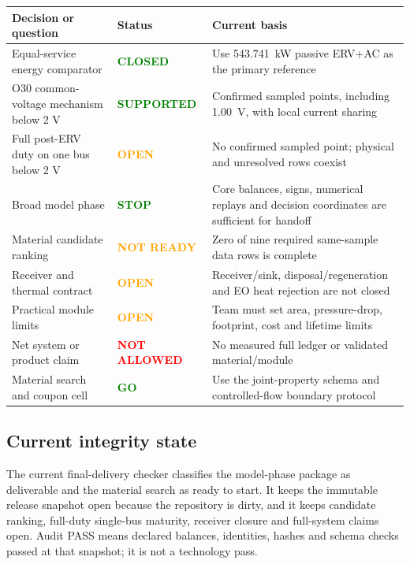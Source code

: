 \documentclass[10pt,a4paper]{article}
\begin{document}
\begin{center}\small
\begin{tabularx}{\textwidth}{@{}p{47mm}p{23mm}Y@{}}
\toprule
\textbf{Decision or question} & \textbf{Status} & \textbf{Current basis} \\
\midrule
Equal-service energy comparator & \textcolor{Green}{\textbf{CLOSED}} &
Use 543.741~kW passive ERV+AC as the primary reference \\
O30 common-voltage mechanism below 2 V & \textcolor{Green}{\textbf{SUPPORTED}} &
Confirmed sampled points, including 1.00~V, with local current sharing \\
Full post-ERV duty on one bus below 2 V & \textcolor{Orange}{\textbf{OPEN}} &
No confirmed sampled point; physical and unresolved rows coexist \\
Broad model phase & \textcolor{Green}{\textbf{STOP}} &
Core balances, signs, numerical replays and decision coordinates are sufficient for handoff \\
Material candidate ranking & \textcolor{Orange}{\textbf{NOT READY}} &
Zero of nine required same-sample data rows is complete \\
Receiver and thermal contract & \textcolor{Orange}{\textbf{OPEN}} &
Receiver/sink, disposal/regeneration and EO heat rejection are not closed \\
Practical module limits & \textcolor{Orange}{\textbf{OPEN}} &
Team must set area, pressure-drop, footprint, cost and lifetime limits \\
Net system or product claim & \textcolor{Red}{\textbf{NOT ALLOWED}} &
No measured full ledger or validated material/module \\
Material search and coupon cell & \textcolor{Green}{\textbf{GO}} &
Use the joint-property schema and controlled-flow boundary protocol \\
\bottomrule
\end{tabularx}
\end{center}

\subsection{Current integrity state}

The current final-delivery checker classifies the model-phase package as
deliverable and the material search as ready to start. It keeps the immutable
release snapshot open because the repository is dirty, and it keeps candidate
ranking, full-duty single-bus maturity, receiver closure and full-system claims
open. Audit PASS means declared balances, identities, hashes and schema checks
passed at that snapshot; it is not a technology pass.
\end{document}
